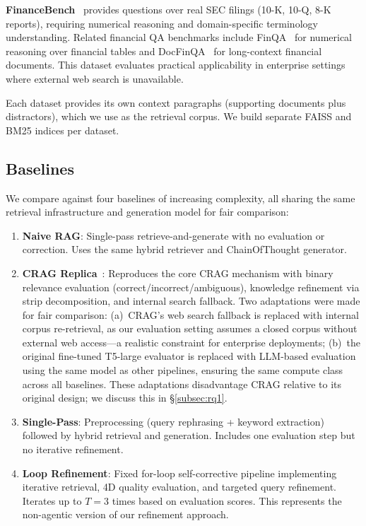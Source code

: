 \textbf{FinanceBench}~\cite{financebench2023} provides questions over real SEC filings (10-K, 10-Q, 8-K reports), requiring numerical reasoning and domain-specific terminology understanding.
Related financial QA benchmarks include FinQA~\cite{chen2021finqa} for numerical reasoning over financial tables and DocFinQA~\cite{reddy2024docfinqa} for long-context financial documents.
This dataset evaluates practical applicability in enterprise settings where external web search is unavailable.

Each dataset provides its own context paragraphs (supporting documents plus distractors), which we use as the retrieval corpus.
We build separate FAISS and BM25 indices per dataset.

\subsection{Baselines}
\label{subsec:baselines}

We compare \ours{} against four baselines of increasing complexity, all sharing the same retrieval infrastructure and generation model for fair comparison:

\begin{enumerate}
    \item \textbf{Naive RAG}: Single-pass retrieve-and-generate with no evaluation or correction. Uses the same hybrid retriever and ChainOfThought generator.

    \item \textbf{CRAG Replica}~\cite{yan2024crag}: Reproduces the core CRAG mechanism with binary relevance evaluation (correct/incorrect/ambiguous), knowledge refinement via strip decomposition, and internal search fallback.
    Two adaptations were made for fair comparison: (a)~CRAG's web search fallback is replaced with internal corpus re-retrieval, as our evaluation setting assumes a closed corpus without external web access---a realistic constraint for enterprise deployments; (b)~the original fine-tuned T5-large evaluator is replaced with LLM-based evaluation using the same model as other pipelines, ensuring the same compute class across all baselines.
    These adaptations disadvantage CRAG relative to its original design; we discuss this in \S\ref{subsec:rq1}.

    \item \textbf{Single-Pass}: Preprocessing (query rephrasing + keyword extraction) followed by hybrid retrieval and generation. Includes one evaluation step but no iterative refinement.

    \item \textbf{Loop Refinement}: Fixed for-loop self-corrective pipeline implementing iterative retrieval, 4D quality evaluation, and targeted query refinement. Iterates up to $T = 3$ times based on evaluation scores. This represents the non-agentic version of our refinement approach.
\end{enumerate}

